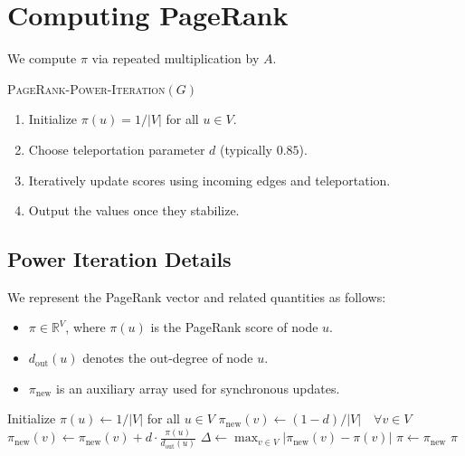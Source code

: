 \documentclass[11pt]{exam}
\begin{document}
\newpage
\section{Computing PageRank}

We compute $\pi$ via repeated multiplication by $A$.

\vspace{0.5em}

\textsc{PageRank-Power-Iteration}$(G)$
\begin{enumerate}
    \item Initialize $\pi(u) = 1/|V|$ for all $u \in V$.
    \item Choose teleportation parameter $d$ (typically $0.85$).
    \item Iteratively update scores using incoming edges and teleportation.
    \item Output the values once they stabilize.
\end{enumerate}

\subsection{Power Iteration Details}

We represent the PageRank vector and related quantities as follows:
\begin{itemize}
    \item $\pi \in \mathbb{R}^V$, where $\pi(u)$ is the PageRank score of node $u$.
    \item $d_{\text{out}}(u)$ denotes the out-degree of node $u$.
    \item $\pi_{\text{new}}$ is an auxiliary array used for synchronous updates.
\end{itemize}

\begin{algorithm}
\caption{\textsc{PageRank-Power-Iteration}$(G,d)$}
\begin{algorithmic}
\State Initialize $\pi(u) \gets 1/|V|$ for all $u \in V$
\Repeat
    \State $\pi_{\text{new}}(v) \gets (1-d)/|V| \quad \forall v \in V$
        \State $\pi_{\text{new}}(v) \gets \pi_{\text{new}}(v) + d \cdot \frac{\pi(u)}{d_{\text{out}}(u)}$
    \EndFor
    \State $\Delta \gets \max_{v \in V} |\pi_{\text{new}}(v) - \pi(v)|$
    \State $\pi \gets \pi_{\text{new}}$
\Until{$\Delta \le \epsilon$}
\State \Return $\pi$
\end{algorithmic}
\end{algorithm}
\end{document}
